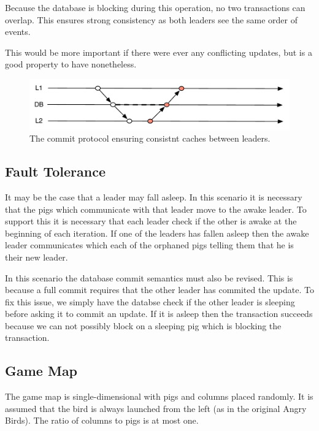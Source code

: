 \documentclass[]{article}
\makeatletter
\def\maxwidth{\ifdim\Gin@nat@width>\linewidth\linewidth
\else\Gin@nat@width\fi}
\let\Oldincludegraphics\includegraphics
\renewcommand{\includegraphics}[1]{\Oldincludegraphics[width=\maxwidth]{#1}}
\makeatother
\begin{document}
Because the database is blocking during this operation, no two transactions can
overlap. This ensures strong consistency as both leaders see the same order of
events. 

This would be more important if there were ever any conflicting updates, but is
a good property to have nonetheless.

\begin{figure}
    \centering
    \includegraphics{figs/commit.pdf}
    \caption{The commit protocol ensuring consistnt caches between leaders.\label{commit}}
\end{figure}

\subsection{Fault Tolerance}



It may be the case that a leader may fall asleep. In this scenario it is
necessary that the pigs which communicate with that leader move to the awake
leader. To support this it is necessary that each leader check if the other is
awake at the beginning of each iteration. If one of the leaders has fallen
asleep then the awake leader communicates which each of the orphaned pigs
telling them that he is their new leader.

In this scenario the database commit semantics must also be revised.  This is
because a full commit requires that the other leader has commited the update.
To fix this issue, we simply have the databse check if the other leader is
sleeping before asking it to commit an update. If it is asleep then the
transaction succeeds because we can not possibly block on a sleeping pig which
is blocking the transaction.

\subsection{Game Map}

The game map is single-dimensional with pigs and columns placed
randomly. It is assumed that the bird is always launched from the left
(as in the original Angry Birds). The ratio of columns to pigs is at
most one.
\end{document}
